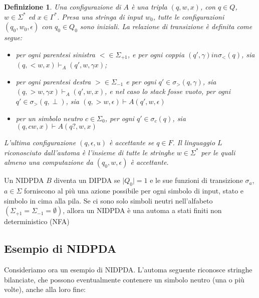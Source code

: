 \documentclass[a4paper,12pt]{report}
\newtheorem{definition}{Definizione}[chapter]
\theoremstyle{propositionstyle}
\begin{document}
    \begin{definition}
        \label{def:configuration-non-det}
        Una configurazione di $A$ è una tripla $\left(q, w, x\right)$, con $q \in Q$, $w \in \Sigma^*$ ed $x \in \Gamma^*$.
        Presa una stringa di input $w_0$, tutte le configurazioni $(q_0, w_0, \epsilon)$ con $q_0 \in Q_0$ sono iniziali.
        La relazione di transizione è definita come segue:

        \begin{itemize}
            \item per ogni parentesi sinistra $< \in \Sigma_{+1}$, e per ogni coppia $\left(q', \gamma\right) in \sigma_<\left(q\right)$, sia $(q, <w, x) \vdash_{A} (q', w, \gamma x)$;
            \item per ogni parentesi destra $> \in \Sigma_{-1}$ e per ogni $q' \in \sigma_>\left(q, \gamma\right)$, sia $(q, >w, \gamma x) \vdash_{A} (q', w, x)$, e nel caso lo stack fosse vuoto, per ogni $q' \in \sigma_>\left(q, \perp\right)$, sia $\left(q, >w, \epsilon\right) \vdash{A} \left(q', w, \epsilon\right)$
            \item per un simbolo neutro $c \in \Sigma_0$, per ogni $q' \in \sigma_c\left(q\right)$, sia $\left(q, cw, x\right) \vdash{A} \left(q?, w, x\right)$
        \end{itemize}

        L'ultima configurazione $\left(q, \epsilon, u\right)$ è accettante se $q \in F$.
        Il linguaggio $L$ riconosciuto dall'automa è l'insieme di tutte le stringhe $w \in \Sigma^*$ per le quali almeno una computazione da $\left(q_0, w, \epsilon\right)$ è accettante.

    \end{definition}

    Un NIDPDA $B$ diventa un DIPDA se $\lvert Q_0\rvert = 1$ e le sue funzioni di transizione $\sigma_a$, $a \in \Sigma$ forniscono al più una azione possibile per ogni simbolo di input, stato e simbolo in cima alla pila.
    Se ci sono solo simboli neutri nell'alfabeto $\left(\Sigma_{+1} = \Sigma_{-1} = \emptyset\right)$, allora un NIDPDA è una automa a stati finiti non deterministico (NFA)

    \subsection{Esempio di NIDPDA}

    Consideriamo ora un esempio di NIDPDA. L'automa seguente riconosce stringhe bilanciate, che possono eventualmente contenere un simbolo neutro (una o più volte), anche alla loro fine:
\end{document}
